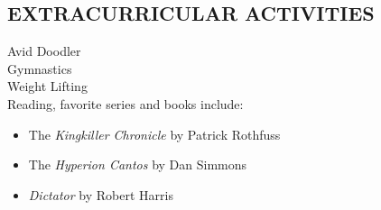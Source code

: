 \documentclass{res}
\begin{document}
\begin{resume}
	
 
\section{EXTRACURRICULAR ACTIVITIES}          
    Avid Doodler\\
    Gymnastics\\
    Weight Lifting\\
    Reading, favorite series and books include:
    \begin{itemize}
    \item The \textit{Kingkiller Chronicle} by Patrick Rothfuss
    \item The \textit{Hyperion Cantos} by Dan Simmons
    \item \textit{Dictator} by Robert Harris
    \end{itemize}
    
\end{resume}
\end{document}
